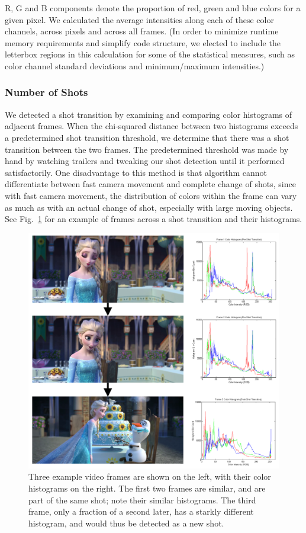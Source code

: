 \documentclass[letterpaper, 10 pt, conference]{ieeeconf}  %
\begin{document}
R, G and B components denote the proportion of red, green and blue colors for a given pixel. We calculated the average intensities along each of these color channels, across pixels and across all frames. (In order to minimize runtime memory requirements and simplify code structure, we elected to include the letterbox regions in this calculation for some of the statistical measures, such as color channel standard deviations and minimum/maximum intensities.)

\subsubsection{Number of Shots}
We detected a shot transition by examining and comparing color histograms of adjacent frames. When the chi-squared distance between two histograms exceeds a predetermined shot transition threshold, we determine that there was a shot transition between the two frames.  The predetermined threshold was made by hand by watching trailers and tweaking our shot detection until it performed satisfactorily. One disadvantage to this method is that algorithm cannot differentiate between fast camera movement and complete change of shots, since with fast camera movement, the distribution of colors within the frame can vary as much as with an actual change of shot, especially with large moving objects. See Fig.~\ref{f:histograms_combined} for an example of frames across a shot transition and their histograms.

\begin{figure}[h]
	\centering
	\includegraphics[width=\columnwidth]{histograms_combined.png}
	\caption{Three example video frames are shown on the left, with their color histograms on the right. The first two frames are similar, and are part of the same shot; note their similar histograms. The third frame, only a fraction of a second later, has a starkly different histogram, and would thus be detected as a new shot.}
	\label{f:histograms_combined}
\end{figure}
\end{document}
